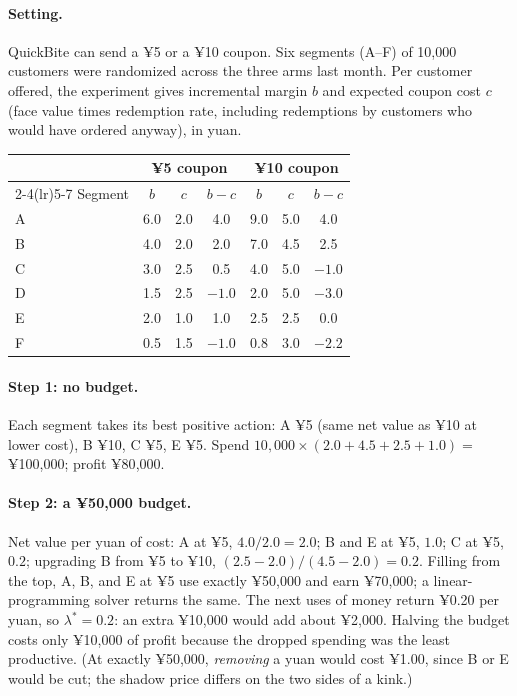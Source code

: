 \documentclass[11pt]{article}
\begin{document}
\paragraph{Setting.} QuickBite can send a ¥5 or a ¥10 coupon. Six segments (A--F) of 10{,}000 customers were randomized
across the three arms last month. Per customer offered, the experiment gives incremental margin $b$ and expected coupon
cost $c$ (face value times redemption rate, including redemptions by customers who would have ordered anyway), in yuan.
\begin{center}
\begin{tabular}{lcccccc}
\toprule
& \multicolumn{3}{c}{¥5 coupon} & \multicolumn{3}{c}{¥10 coupon} \\
\cmidrule(lr){2-4}\cmidrule(lr){5-7}
Segment & $b$ & $c$ & $b - c$ & $b$ & $c$ & $b - c$ \\
\midrule
A & 6.0 & 2.0 & 4.0 & 9.0 & 5.0 & 4.0 \\
B & 4.0 & 2.0 & 2.0 & 7.0 & 4.5 & 2.5 \\
C & 3.0 & 2.5 & 0.5 & 4.0 & 5.0 & $-1.0$ \\
D & 1.5 & 2.5 & $-1.0$ & 2.0 & 5.0 & $-3.0$ \\
E & 2.0 & 1.0 & 1.0 & 2.5 & 2.5 & 0.0 \\
F & 0.5 & 1.5 & $-1.0$ & 0.8 & 3.0 & $-2.2$ \\
\bottomrule
\end{tabular}
\end{center}

\paragraph{Step 1: no budget.} Each segment takes its best positive action: A ¥5 (same net value as ¥10 at lower cost), B ¥10,
C ¥5, E ¥5. Spend $10{,}000 \times (2.0 + 4.5 + 2.5 + 1.0) = $ ¥100{,}000; profit ¥80{,}000.

\paragraph{Step 2: a ¥50{,}000 budget.} Net value per yuan of cost: A at ¥5, $4.0/2.0 = 2.0$; B and E at ¥5, $1.0$; C at ¥5, $0.2$;
upgrading B from ¥5 to ¥10, $(2.5 - 2.0)/(4.5 - 2.0) = 0.2$. Filling from the top, A, B, and E at ¥5 use exactly ¥50{,}000 and earn
¥70{,}000; a linear-programming solver returns the same. The next uses of money return ¥0.20 per yuan, so
$\lambda^\ast = 0.2$: an extra ¥10{,}000 would add about ¥2{,}000. Halving the budget costs only ¥10{,}000 of profit because the
dropped spending was the least productive. (At exactly ¥50{,}000, \emph{removing} a yuan would cost ¥1.00, since B or E would be
cut; the shadow price differs on the two sides of a kink.)
\end{document}
